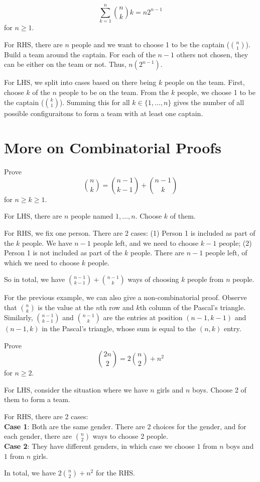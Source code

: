 \begin{example}
    $$
    \sum_{k=1}^n \binom{n}{k} k = n 2^{n-1}
    $$
    for $n \geq 1$.

    For RHS, there are $n$ people and we want to choose 1 to be the captain ($\binom{n}{1}$). Build a team around the captain. For each of the $n-1$ others not chosen, they can be either on the team or not. Thus, $n (2^{n-1})$.

    For LHS, we split into cases based on there being $k$ people on the team. First, choose $k$ of the $n$ people to be on the team. From the $k$ people, we choose 1 to be the captain ($\binom{k}{1}$). Summing this for all $k \in \{1,\ldots,n\}$ gives the number of all possible configuraitons to form a team with at least one captain.
\end{example}


\section{More on Combinatorial Proofs}

\begin{example}
    Prove
    $$
    \binom{n}{k} = \binom{n - 1}{k - 1} + \binom{n - 1}{k}
    $$
    for $n \geq k \geq 1$.

    For LHS, there are $n$ people named $1, \ldots, n$. Choose $k$ of them.

    For RHS, we fix one person. There are 2 cases: (1) Person 1 is included as part of the $k$ people. We have $n-1$ people left, and we need to choose $k-1$ people; (2) Person 1 is not included as part of the $k$ people. There are $n-1$ people left, of which we need to choose $k$ people.

    So in total, we have $\binom{n-1}{k-1} + \binom{n-1}{k}$ ways of choosing $k$ people from $n$ people.
\end{example}

For the previous example, we can also give a non-combinatorial proof. Observe that $\binom{n}{k}$ is the value at the $n$th row and $k$th column of the Pascal's triangle. Similarly, $\binom{n-1}{k-1}$ and $\binom{n-1}{k}$ are the entries at position $(n-1,k-1)$ and $(n-1,k)$ in the Pascal's triangle, whose sum is equal to the $(n,k)$ entry.

\begin{example}
    Prove
    $$
    \binom{2n}{2} = 2 \binom{n}{2} + n^2
    $$
    for $n \geq 2$.

    For LHS, consider the situation where we have $n$ girls and $n$ boys. Choose 2 of them to form a team.

    For RHS, there are 2 cases: \\
    \textbf{Case 1}: Both are the same gender. There are 2 choices for the gender, and for each gender, there are $\binom{n}{2}$ ways to choose 2 people. \\
    \textbf{Case 2}: They have different genders, in which case we choose $1$ from $n$ boys and $1$ from $n$ girls.

    In total, we have $2 \binom{n}{2} + n^2$ for the RHS.
\end{example}

